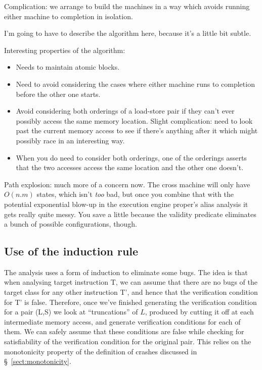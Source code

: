 Complication: we arrange to build the machines in a way which avoids running either machine to completion in isolation.

I'm going to have to describe the algorithm here, because it's a little bit subtle.

Interesting properties of the algorithm:

\begin{itemize}
\item
  Needs to maintain atomic blocks.
\item
  Need to avoid considering the cases where either machine runs to completion before the other one starts.
\item
  Avoid considering both orderings of a load-store pair if they can't ever possibly access the same memory location.
  Slight complication: need to look past the current memory access to see if there's anything after it which might possibly race in an interesting way.
\item
  When you do need to consider both orderings, one of the orderings asserts that the two accesses access the same location and the other one doesn't.
\end{itemize}

Path explosion: much more of a concern now.
The cross machine will only have $O(n.m)$ states, which isn't \emph{too} bad, but once you combine that with the potential exponential blow-up in the execution engine proper's alias analysis it gets really quite messy.
You save a little because the validity predicate eliminates a bunch of possible configurations, though.

\subsection{Use of the induction rule}

The analysis uses a form of induction to eliminate some bugs.
The idea is that when analysing target instruction T, we can assume that there are no bugs of the target class for any other instruction T', and hence that the verification condition for T' is false.
Therefore, once we've finished generating the verification condition for a \StateMachine pair (L,S) we look at ``truncations'' of $L$, produced by cutting it off at each intermediate memory access, and generate verification conditions for each of them.
We can safely assume that these conditions are false while checking for satisfiability of the verification condition for the original \StateMachine pair.
This relies on the monotonicity property of the definition of crashes discussed in \S~\ref{sect:monotonicity}.

